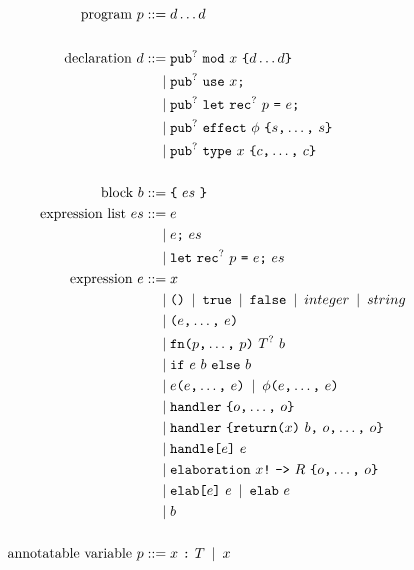\begin{figure}[p]
\begin{align*}
    \text{program}\ p
        \IS & d \dots d\\
    \\
    \text{declaration}\ d
        \IS & \opt{\tok{pub}}\ \tok{mod}\ x\ \tok{\{} \rep{d} \tok{\}}\\
        \OR & \opt{\tok{pub}}\ \tok{use}\ x\tok{;}\\
        \OR & \opt{\tok{pub}}\ \tok{let}\ \opt{\tok{rec}}\ p\ \tok{=}\ e\tok{;}\\
        \OR & \opt{\tok{pub}}\ \tok{effect}\ \phi\ \tok{\{} \csep{s} \tok{\}}\\
        \OR & \opt{\tok{pub}}\ \tok{type}\ x\ \tok{\{} \csep{c} \tok{\}}\\
    \\
    \text{block}\ b
        \IS & \tok{\{}\ es\ \tok{\}}\\
    \text{expression list}\ es
        \IS & e\\
        \OR & e\tok{;}\ es\\
        \OR & \tok{let}\ \opt{\tok{rec}}\ p\ \tok{=}\ e\tok{;}\ es\\
    \text{expression}\ e
        \IS & x\\
        \OR & \tok{()} \OR \tok{true} \OR \tok{false} \OR integer \OR string \\
        \OR & \tok{(} \csep{e} \tok{)} \\
        \OR & \tok{fn} \tok{(} \csep{p} \kw{)}\ \opt{T}\ b \\
        \OR & \tok{if}\ e\ b\ \tok{else}\ b\\
        \OR & e\tok{(} \csep{e} \tok{)} \OR \phi\tok{(} \csep{e} \tok{)} \\
        \OR & \tok{handler}\ \tok{\{} \csep{o} \tok{\}}\\
        \OR & \tok{handler}\ \tok{\{} \tok{return} \tok{(}x\tok{)}\ b \tok{,}\ \csep{o} \tok{\}}\\
        \OR & \tok{handle}\tok{[}e\tok{]}\ e \\
        \OR & \tok{elaboration}\ x\tok{!}\ \tok{->}\ R\ \tok{\{} \csep{o} \tok{\}}\\
        \OR & \tok{elab}\tok{[} e \tok{]}\ e \OR \tok{elab}\ e \\
        \OR & b\\
    \\
    \text{annotatable variable}\ p
        \IS & x\ \tok{:}\ T \OR x\\

\end{align*}
\end{figure}
